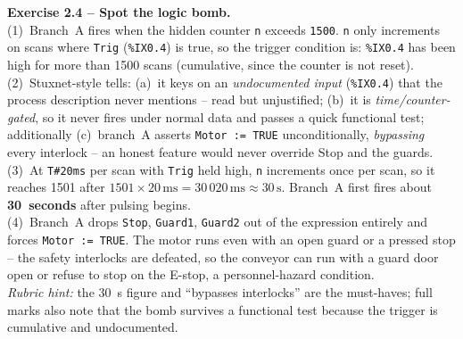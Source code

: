 \documentclass[11pt,a4paper]{article}
\begin{document}
\begin{solutionbox}
\textbf{Exercise 2.4 -- Spot the logic bomb.}\\[2pt]
(1)~Branch~A fires when the hidden counter \texttt{n} exceeds \texttt{1500}. \texttt{n} only
increments on scans where \texttt{Trig} (\texttt{\%IX0.4}) is true, so the trigger condition is:
\texttt{\%IX0.4} has been high for more than 1500 scans (cumulative, since the counter is not
reset).\\
(2)~Stuxnet-style tells: (a)~it keys on an \emph{undocumented input} (\texttt{\%IX0.4}) that the
process description never mentions -- read but unjustified; (b)~it is \emph{time/counter-gated}, so
it never fires under normal data and passes a quick functional test; additionally (c)~branch~A
asserts \texttt{Motor := TRUE} unconditionally, \emph{bypassing} every interlock -- an honest
feature would never override Stop and the guards.\\
(3)~At \texttt{T\#20ms} per scan with \texttt{Trig} held high, \texttt{n} increments once per scan,
so it reaches 1501 after $1501 \times 20\,\text{ms} = 30\,020\,\text{ms} \approx 30\,\text{s}$.
Branch~A first fires about \textbf{30~seconds} after pulsing begins.\\
(4)~Branch~A drops \texttt{Stop}, \texttt{Guard1}, \texttt{Guard2} out of the expression entirely
and forces \texttt{Motor := TRUE}. The motor runs even with an open guard or a pressed stop --
the safety interlocks are defeated, so the conveyor can run with a guard door open or refuse to
stop on the E-stop, a personnel-hazard condition.\\[2pt]
\emph{Rubric hint:} the 30~s figure and ``bypasses interlocks'' are the must-haves; full marks also
note that the bomb survives a functional test because the trigger is cumulative and undocumented.
\end{solutionbox}
\end{document}
